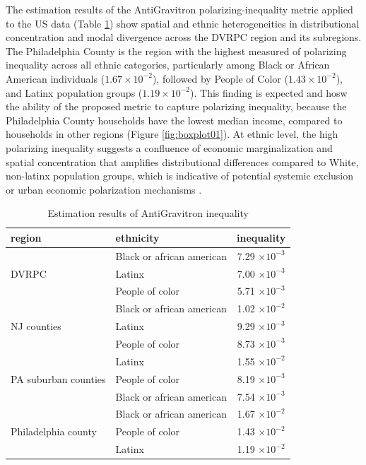 \documentclass[11pt]{article}
\begin{document}
The estimation results of the AntiGravitron polarizing-inequality metric applied to the US data (Table \ref{tab:resineqUS}) show spatial and ethnic heterogeneities in distributional concentration and modal divergence across the DVRPC region and its subregions. The Philadelphia County is the region with the highest measured of polarizing inequality across all ethnic categories, particularly among Black or African American individuals ($1.67 \times 10^{-2}$), followed by People of Color ($1.43 \times 10^{-2}$), and Latinx population groups ($1.19 \times 10^{-2}$). This finding is expected and hosw the ability of the proposed metric to capture polarizing inequality, because the  Philadelphia County households have the lowest median income, compared to households in other regions (Figure \ref{fig:boxplot01}). At ethnic level, the high polarizing inequality suggests a confluence of economic marginalization and spatial concentration that amplifies distributional differences compared to White, non-latinx population groups, which is indicative of potential systemic exclusion or urban economic polarization mechanisms \citep{chetty2018race, powell2008structural}.

\renewcommand{\arraystretch}{1.1}
\begin{table}[ht!]
    \centering
    \caption{Estimation results of AntiGravitron inequality}
    \label{tab:resineqUS}
    \medskip
\begin{tabular}{llc}
   \toprule
        \textbf{region} & \textbf{ethnicity} & \textbf{inequality} \\ \midrule
            & Black or african american & 7.29 $\times 10^{-3}$ \\
        DVRPC & Latinx & 7.00 $\times 10^{-3}$ \\
            & People of color & 5.71 $\times 10^{-3}$ \\ \hline
            & Black or african american & 1.02 $\times 10^{-2}$ \\ 
        NJ counties & Latinx & 9.29 $\times 10^{-3}$ \\ 
            & People of color & 8.73 $\times 10^{-3}$ \\ \hline
            & Latinx & 1.55 $\times 10^{-2}$ \\ 
        PA suburban counties & People of color & 8.19 $\times 10^{-3}$ \\ 
            & Black or african american & 7.54 $\times 10^{-3}$ \\ \hline
            & Black or african american & 1.67 $\times 10^{-2}$ \\ 
        Philadelphia county & People of color & 1.43 $\times 10^{-2}$ \\ 
            & Latinx & 1.19 $\times 10^{-2}$ \\ \bottomrule
    \end{tabular}
\end{table}
\end{document}
